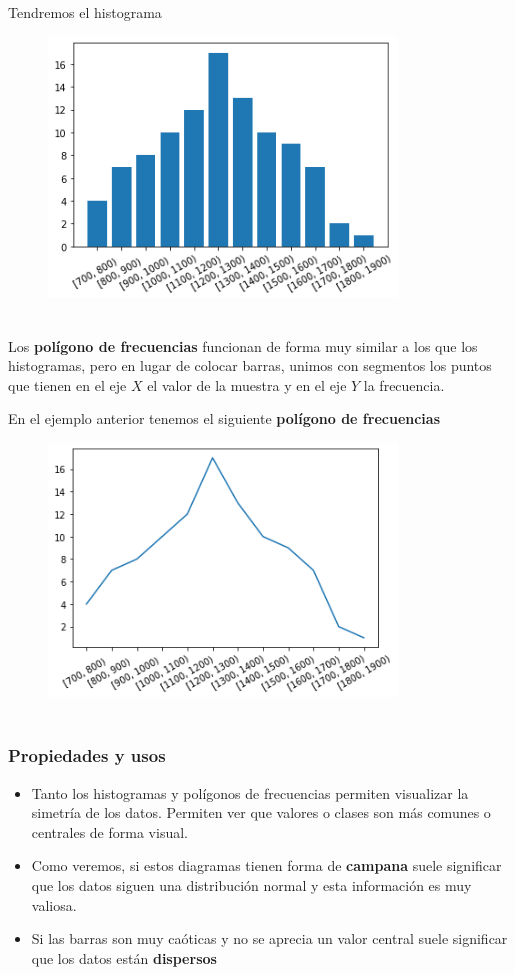 \documentclass[
]{article}
\providecommand{\tightlist}{%
  \setlength{\itemsep}{0pt}\setlength{\parskip}{0pt}}
\begin{document}
Tendremos el histograma

\begin{figure}
\centering
\includegraphics[width=3.64583in,height=\textheight]{img/histograma2.png}
\caption{~}
\end{figure}

Los \textbf{polígono de frecuencias} funcionan de forma muy similar a
los que los histogramas, pero en lugar de colocar barras, unimos con
segmentos los puntos que tienen en el eje \(X\) el valor de la muestra y
en el eje \(Y\) la frecuencia.

En el ejemplo anterior tenemos el siguiente \textbf{polígono de
frecuencias}

\begin{figure}
\centering
\includegraphics[width=3.64583in,height=\textheight]{img/diag_barras.png}
\caption{~}
\end{figure}

\hypertarget{propiedades-y-usos}{%
\subsubsection{Propiedades y usos}\label{propiedades-y-usos}}

\begin{itemize}
\tightlist
\item
  Tanto los histogramas y polígonos de frecuencias permiten visualizar
  la simetría de los datos. Permiten ver que valores o clases son más
  comunes o centrales de forma visual.
\item
  Como veremos, si estos diagramas tienen forma de \textbf{campana}
  suele significar que los datos siguen una distribución normal y esta
  información es muy valiosa.
\item
  Si las barras son muy caóticas y no se aprecia un valor central suele
  significar que los datos están \textbf{dispersos}
\end{itemize}
\end{document}

